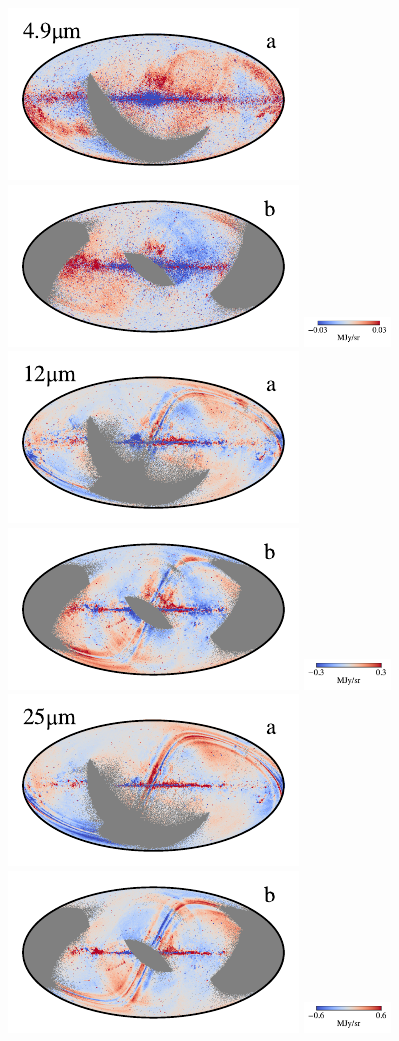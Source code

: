 \documentclass[twocolumn]{aa}
\begin{document}
\begin{figure}[t]
    \includegraphics[width=0.22\linewidth]{figs/compare_zodi_res/cosmoglobe_res_04a.pdf}%
    \includegraphics[width=0.22\linewidth]{figs/compare_zodi_res/cosmoglobe_res_04b.pdf}%
    \includegraphics[width=23mm,angle=90]{figs/compare_zodi_res/cbar_04.pdf}\\
    \includegraphics[width=0.22\linewidth]{figs/compare_zodi_res/cosmoglobe_res_05a.pdf}%
    \includegraphics[width=0.22\linewidth]{figs/compare_zodi_res/cosmoglobe_res_05b.pdf}%
    \includegraphics[width=23mm,angle=90]{figs/compare_zodi_res/cbar_05.pdf}\hspace*{3mm}
    \includegraphics[width=0.22\linewidth]{figs/compare_zodi_res/cosmoglobe_res_06a.pdf}%
    \includegraphics[width=0.22\linewidth]{figs/compare_zodi_res/cosmoglobe_res_06b.pdf}%
    \includegraphics[width=23mm,angle=90]{figs/compare_zodi_res/cbar_06.pdf}\\

\end{figure}
\end{document}
